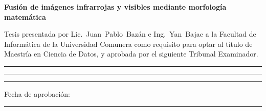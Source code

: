 \documentclass[12pt,a4paper,oneside]{book}
\newcommand{\titulotesis}{Fusión de imágenes infrarrojas y visibles mediante morfología matemática}
\newcommand{\facultad}{Facultad de Informática}
\newcommand{\programa}{Maestría en Ciencia de Datos}
\newcommand{\autorA}{Juan Pablo Bazán}
\newcommand{\autorB}{Yan Bajac}
\begin{document}
\thispagestyle{empty}
\begin{center}
{\huge\bfseries \titulotesis\par}
\vspace{2cm}
\begin{minipage}{0.75\textwidth}\centering\large
Tesis presentada por Lic.~\mbox{\autorA} e \mbox{Ing.~\autorB} a la \facultad{} de la Universidad Comunera
como requisito para optar al título de \programa, y aprobada por el siguiente Tribunal Examinador.
\end{minipage}\par
\vspace{2.5cm}
\newcommand{\firma}{\rule{0.55\textwidth}{0.4pt}\par\vspace{0.2cm}{\large Nombre y firma\par}\vspace{1.6cm}}
\firma\firma\firma
{\large Fecha de aprobación: \rule{0.3\textwidth}{0.4pt}\par}
\end{center}
\clearpage





\tableofcontents

\clearpage{}
\listoffigures
\clearpage{}
\listoftables

\mainmatter









\printbibliography[heading=bibintoc,title={Referencias}]


\end{document}
